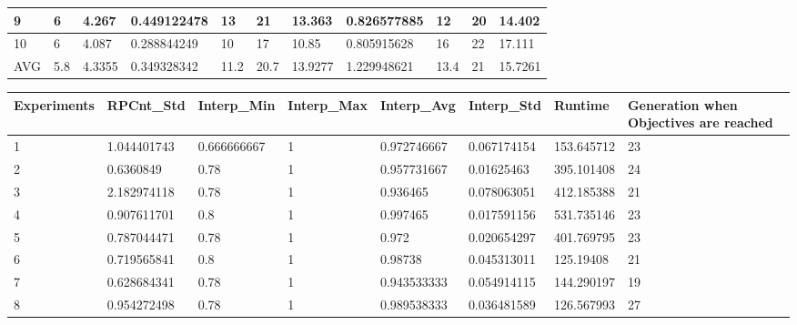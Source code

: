 \begin{table}[H]
\begin{adjustbox}{max width=380pt,keepaspectratio,angle=90}
\begin{tabular}{|l|l|l|l|l|l|l|l|l|l|l|}
					9           & 6            & 4.267        & 0.449122478  & 13         & 21         & 13.363     & 0.826577885 & 12         & 20         & 14.402     \\ \hline
					10          & 6            & 4.087        & 0.288844249  & 10         & 17         & 10.85      & 0.805915628 & 16         & 22         & 17.111     \\ \hline
					AVG         & 5.8          & 4.3355       & 0.349328342  & 11.2       & 20.7       & 13.9277    & 1.229948621 & 13.4       & 21         & 15.7261    \\ \hline
				\end{tabular}
			\end{adjustbox}
			\begin{adjustbox}{max width=340pt,keepaspectratio,angle=90}
				\begin{tabular}{|l|l|l|l|l|l|l|l|}
					\hline
					\rowcolor[HTML]{EFEFEF} 
					Experiments & RPCnt\_Std  & Interp\_Min & Interp\_Max & Interp\_Avg & Interp\_Std & Runtime     & Generation when Objectives are reached \\ \hline
					1           & 1.044401743 & 0.666666667 & 1           & 0.972746667 & 0.067174154 & 153.645712  & 23                                     \\ \hline
					2           & 0.6360849   & 0.78        & 1           & 0.957731667 & 0.01625463  & 395.101408  & 24                                     \\ \hline
					3           & 2.182974118 & 0.78        & 1           & 0.936465    & 0.078063051 & 412.185388  & 21                                     \\ \hline
					4           & 0.907611701 & 0.8         & 1           & 0.997465    & 0.017591156 & 531.735146  & 23                                     \\ \hline
					5           & 0.787044471 & 0.78        & 1           & 0.972       & 0.020654297 & 401.769795  & 23                                     \\ \hline
					6           & 0.719565841 & 0.8         & 1           & 0.98738     & 0.045313011 & 125.19408   & 21                                     \\ \hline
					7           & 0.628684341 & 0.78        & 1           & 0.943533333 & 0.054914115 & 144.290197  & 19                                     \\ \hline
					8           & 0.954272498 & 0.78        & 1           & 0.989538333 & 0.036481589 & 126.567993  & 27                                     \\ \hline

\end{tabular}
\end{adjustbox}
\end{table}
